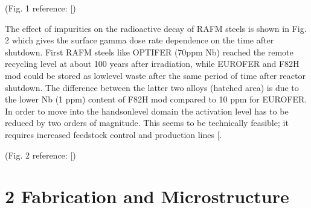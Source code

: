\documentclass[letterpaper,10pt,english]{jupyterBook}
\begin{document}
	
	
	\sphinxAtStartPar
	(Fig. 1 reference: {[}\sphinxhref{https://drive.google.com/file/d/1I2HdcwxX8cPrN41pbrgvMhZqhHnZ3vxO/view?usp=drive\_link}{Cheng1998}{]})
	
	\sphinxAtStartPar
	The effect of impurities on the radioactive decay of RAFM steels is shown in Fig. 2 which gives the surface gamma dose rate dependence on the time after shutdown. First RAFM steels like OPTIFER (70ppm Nb) reached the remote recycling level at about 100 years after irradiation, while EUROFER and F82H mod could be stored as low\sphinxhyphen{}level waste after the same period of time after reactor shut\sphinxhyphen{}down. The difference between the latter two alloys (hatched area) is due to the lower Nb (1 ppm) content of F82H mod compared to 10 ppm for EUROFER. In order to move into the hands\sphinxhyphen{}on\sphinxhyphen{}level domain the activation level has to be reduced by two orders of magnitude. This seems to be technically feasible; it requires increased feedstock control and production lines {[}\sphinxhref{https://drive.google.com/file/d/1AX6acCKhvJYgiOexBjGP0900i4lfScBi/view?usp=drive\_link}{Lindau2005}{]}.
	
	
	
	\sphinxAtStartPar
	(Fig. 2 reference: {[}\sphinxhref{https://drive.google.com/file/d/1AX6acCKhvJYgiOexBjGP0900i4lfScBi/view?usp=drive\_link}{Lindau2005}{]})
	
	\sphinxstepscope
	
	
	\chapter{2 Fabrication and Microstructure}
	\label{\detokenize{2 Fabrication and Microstructure:fabrication-and-microstructure}}\label{\detokenize{2 Fabrication and Microstructure::doc}}
	
\end{document}

